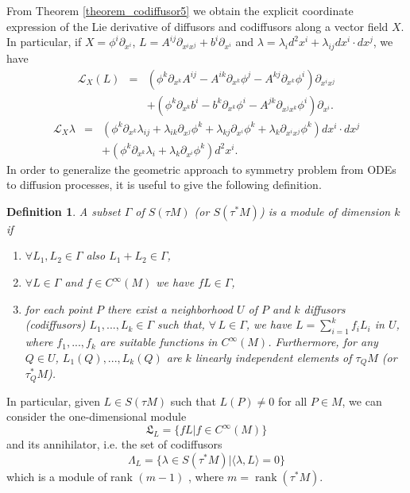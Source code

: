 \documentclass{article}[10pt]
\newtheorem{definition}[theorem]{Definition}
\newcommand{\cinf}[0]{C^{\infty}}
\newcommand{\rank}[0]{\operatorname{rank}}
\begin{document}
From Theorem \ref{theorem_codiffusor5} we  obtain the explicit
coordinate expression of the Lie derivative of diffusors and
codiffusors along a vector field $X$. In particular, if $ X = \phi ^ i \partial_
{x ^ i} $,    $L = A ^ {ij}
\partial_ {x^ ix ^ j} + b ^ i \partial_ {x ^ i} $ and $\lambda=\lambda_i d^2x^i+\lambda_{ij}dx^i\cdot dx^j$, we have
\begin{eqnarray*}
\mathcal{L}_X(L)&=&(\phi^k\partial_{x^k}A^{ij}-A^{ik}\partial_{x^k}\phi^j-A^{kj}\partial_{x^k}\phi^i)\partial_{x^ix^j}\\
&&+(\phi^k\partial_{x^k}b^i-b^k\partial_{x^k}\phi^i-A^{jk}\partial_{x^jx^k}\phi^i)\partial_{x^i}.
\end{eqnarray*}
\begin{eqnarray*}
\mathcal{L}_X\lambda&=&(\phi^k\partial_{x^k}\lambda_{ij}+\lambda_{ik} \partial_{x^j}\phi^k+\lambda_{kj} \partial_{x^i}\phi^k+\lambda_k\partial_{x^ix^j}\phi^k)dx^i \cdot dx^j\\
&&+(\phi^k\partial_{x^k}\lambda_i+\lambda_k \partial_{x^i}\phi^k)d^2x^i.
\end{eqnarray*}
In order to generalize the geometric approach to symmetry problem  from ODEs  to diffusion processes, it is useful to give the following definition.

\begin{definition}\label{definition_module}
A subset  $\Gamma$  of $S(\tau M)$ (or $S(\tau^* M)$) is  a \emph{module of dimension $k$} if
\begin{enumerate}
\item  $\forall L_1,L_2 \in \Gamma$ also $L_1+L_2 \in \Gamma$,
\item  $\forall L \in \Gamma$ and $f \in \cinf(M)$ we have  $f L \in \Gamma$,
\item for each point $P$ there exist a neighborhood $U$ of $P$ and $k$ diffusors (codiffusors) $L_1,...,L_k \in \Gamma$ such that,  $ \forall \, L \in \Gamma$, we have
 $L=\sum_{i=1}^k f_iL_i$ in $U$, where  $f_1,...,f_k$ are suitable functions in $\cinf(M)$. Furthermore, for any $Q \in U$,  $L_1(Q),...,L_k(Q)$ are $k$ linearly independent elements
of $\tau_QM$ (or $\tau^*_QM$).
\end{enumerate}
\end{definition}

In particular, given $ L \in S (\tau M) $ such
that $ L (P) \not = 0 $ for all $P \in M$, we can consider the one-dimensional module
$$\mathfrak{L}_L=\{ f L| f \in \cinf(M)\}$$
and its annihilator, i.e. the set of
codiffusors
$$\Lambda_L=\{\lambda \in S(\tau^* M) | \langle \lambda,L\rangle=0\}$$
which is a module of rank  $(m-1)$ , where $m= \rank(\tau ^ * M)$.
\end{document}
